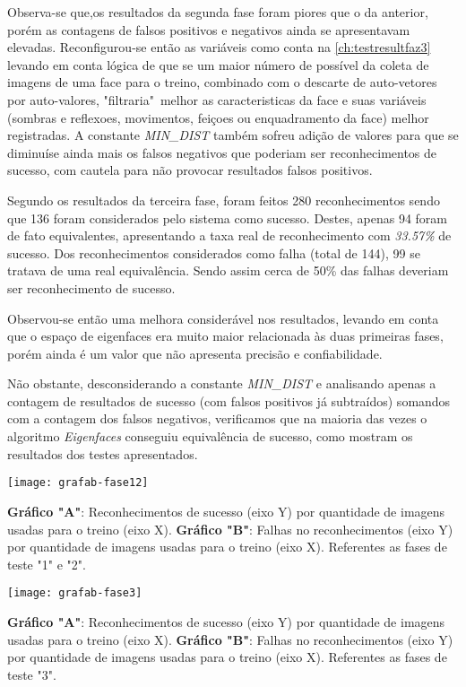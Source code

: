 Observa-se que,os resultados da segunda fase foram piores que o da anterior, porém as contagens de falsos positivos e negativos ainda se apresentavam elevadas. Reconfigurou-se então as variáveis como conta na \autoref{ch:testresultfaz3} levando em conta lógica de que se um maior número de possível da coleta de imagens de uma face para o treino, combinado com o descarte de auto-vetores por auto-valores, "filtraria"\ melhor as caracteristicas da face e suas variáveis (sombras e reflexoes, movimentos, feiçoes ou enquadramento da face) melhor registradas. A constante \textit{MIN\_DIST} também sofreu adição de valores para que se diminuíse ainda mais os falsos negativos que poderiam ser reconhecimentos de sucesso, com cautela para não provocar resultados falsos positivos.

Segundo os resultados da terceira fase, foram feitos 280 reconhecimentos sendo que 136 foram considerados pelo sistema como sucesso. Destes, apenas 94 foram de fato equivalentes, apresentando a taxa real de reconhecimento com \textit{33.57\%} de sucesso. Dos reconhecimentos considerados como falha (total de 144), 99 se tratava de uma real equivalência. Sendo assim cerca de 50\% das falhas deveriam ser reconhecimento de sucesso.

Observou-se então uma melhora considerável nos resultados, levando em conta que o espaço de eigenfaces era muito maior relacionada às duas primeiras fases, porém ainda é um valor que não apresenta precisão e confiabilidade. 

Não obstante, desconsiderando a constante \textit{MIN\_DIST} e analisando apenas a contagem de resultados de sucesso (com falsos positivos já subtraídos) somandos com a contagem dos falsos negativos, verificamos que na maioria das vezes o algoritmo \textit{Eigenfaces} conseguiu equivalência de sucesso, como mostram os resultados dos testes apresentados.


\begin{grafico}[h]
	\centering
	\texttt{[image: grafab-fase12]}
	\caption{\textbf{Gráfico "A"}: Reconhecimentos de sucesso (eixo Y) por quantidade de imagens usadas para o treino (eixo X). \textbf{Gráfico "B"}: Falhas no reconhecimentos (eixo Y) por quantidade de imagens usadas para o treino (eixo X). Referentes as fases de teste "1" e "2".}
	\label{grafab-fase12}
\end{grafico}

\begin{grafico}[h]
	\centering
	\texttt{[image: grafab-fase3]}
	\caption{\textbf{Gráfico "A"}: Reconhecimentos de sucesso (eixo Y) por quantidade de imagens usadas para o treino (eixo X). \textbf{Gráfico "B"}: Falhas no reconhecimentos (eixo Y) por quantidade de imagens usadas para o treino (eixo X). Referentes as fases de teste "3".}
	\label{grafab-fase3}
\end{grafico}


